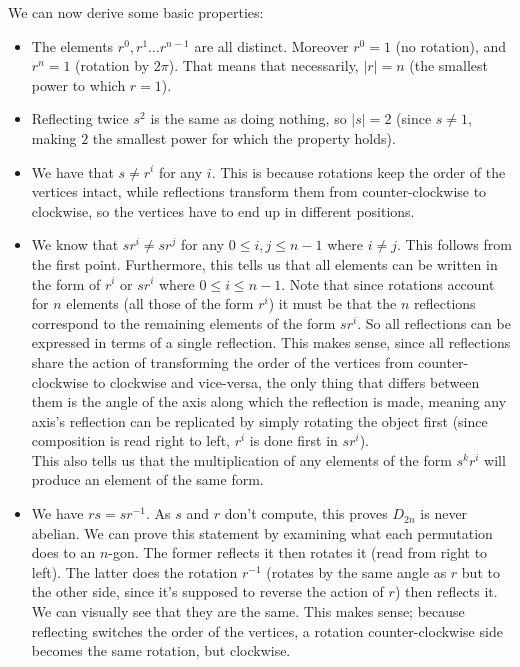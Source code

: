 \documentclass[12pt]{article}
\begin{document}
    We can now derive some basic properties:
    \begin{itemize}[label=$\diamond$]
        \item 
            The elements $r^0, r^1 \dots r^{n-1}$ are all distinct.
            Moreover $r^0 = 1$ (no rotation),
            and $r^n = 1$ (rotation by $2\pi$).
            That means that necessarily, $|r| = n$
            (the smallest power to which $r = 1$).
        \item 
            Reflecting twice $s^2$ is the same as doing nothing,
            so $|s| = 2$
            (since $s \neq 1$,
            making $2$ the smallest power for which the property holds).
        \item
            We have that $s \neq r^i$ for any $i$.
            This is because rotations keep the order of the vertices intact,
            while reflections transform them from
            counter-clockwise to clockwise,
            so the vertices have to end up in different positions.
        \item
            We know that $sr^{i} \neq sr^j$
            for any $0 \leqslant i, j \leqslant n-1$ where $i \neq j$.
            This follows from the first point.
            Furthermore, this tells us that all elements can be written
            in the form of $r^i$ or $sr^i$
            where $0 \leqslant i \leqslant n-1$.
            Note that since rotations account for $n$ elements
            (all those of the form $r^i$)
            it must be that the $n$ reflections
            correspond to the remaining elements of the form $sr^i$.
            So all reflections can be expressed in terms of a single reflection.
            This makes sense, since all reflections share the action
            of transforming the order of the vertices 
            from counter-clockwise to clockwise and vice-versa,
            the only thing that differs between them is the angle
            of the axis along which the reflection is made,
            meaning any axis's reflection can be replicated by
            simply rotating the object first
            (since composition is read right to left,
            $r^i$ is done first in $sr^i$). \\
            This also tells us that the multiplication of any
            elements of the form $s^kr^i$
            will produce an element of the same form.
        \item
            We have $rs = sr^{-1}$.
            As $s$ and $r$ don't compute,
            this proves $D_{2n}$ is never abelian.
            We can prove this statement by examining what each permutation
            does to an $n$-gon.
            The former reflects it then rotates it
            (read from right to left).
            The latter does the rotation $r^{-1}$
            (rotates by the same angle as $r$ but to the other side,
            since it's supposed to reverse the action of $r$)
            then reflects it.
            We can visually see that they are the same.
            This makes sense;
            because reflecting switches the order of the vertices,
            a rotation counter-clockwise side becomes the same rotation,
            but clockwise. \\


\end{itemize}
\end{document}
